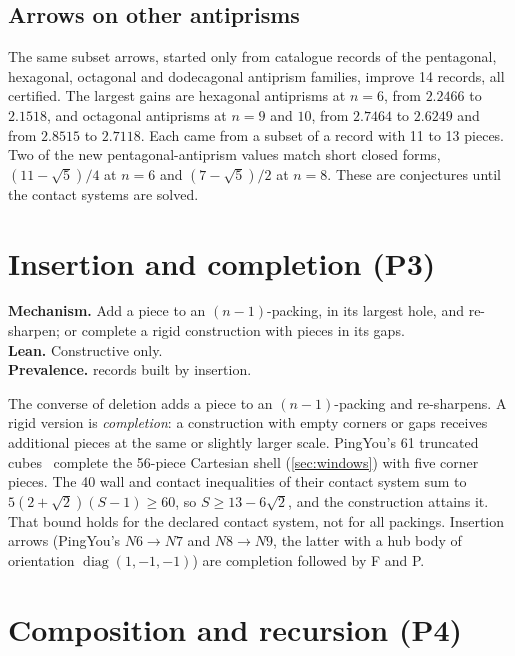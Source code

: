 \documentclass[11pt,a4paper]{article}
\begin{document}
\subsection{Arrows on other antiprisms}
The same subset arrows, started only from catalogue records of the pentagonal, hexagonal, octagonal and dodecagonal antiprism families, improve 14 records, all certified. The largest gains are hexagonal antiprisms at $n=6$, from $2.2466$ to $2.1518$, and octagonal antiprisms at $n=9$ and $10$, from $2.7464$ to $2.6249$ and from $2.8515$ to $2.7118$. Each came from a subset of a record with 11 to 13 pieces. Two of the new pentagonal-antiprism values match short closed forms, $(11-\sqrt5)/4$ at $n=6$ and $(7-\sqrt5)/2$ at $n=8$. These are conjectures until the contact systems are solved.

\section{Insertion and completion (P3)}\label{sec:insertion}

\begin{summarybox}
\textbf{Mechanism.} Add a piece to an $(n-1)$-packing, in its largest hole, and re-sharpen; or complete a rigid construction with pieces in its gaps.\\
\textbf{Lean.} Constructive only.\\
\textbf{Prevalence.} \nAscend{} records built by insertion.
\end{summarybox}

The converse of deletion adds a piece to an $(n-1)$-packing and re-sharpens. A rigid version is \emph{completion}: a construction with empty corners or gaps receives additional pieces at the same or slightly larger scale. PingYou's 61 truncated cubes~\cite{pingSixteen} complete the 56-piece Cartesian shell (\cref{sec:windows}) with five corner pieces. The 40 wall and contact inequalities of their contact system sum to $5(2+\sqrt2)(S-1)\ge 60$, so $S\ge 13-6\sqrt2$, and the construction attains it. That bound holds for the declared contact system, not for all packings. Insertion arrows (PingYou's $N6\to N7$ and $N8\to N9$, the latter with a hub body of orientation $\operatorname{diag}(1,-1,-1)$) are completion followed by F and P.

\section{Composition and recursion (P4)}\label{sec:compose}
\end{document}
